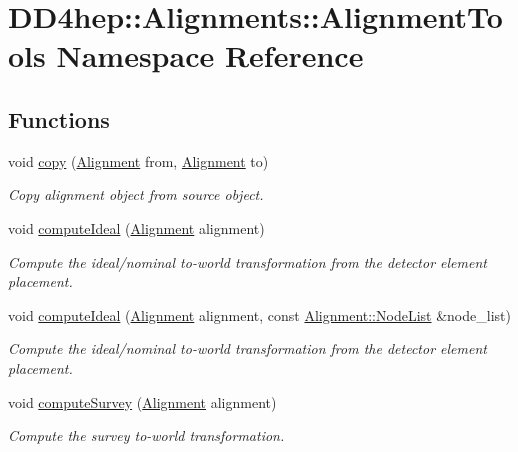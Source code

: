 \hypertarget{namespace_d_d4hep_1_1_alignments_1_1_alignment_tools}{
\section{DD4hep::Alignments::AlignmentTools Namespace Reference}
\label{namespace_d_d4hep_1_1_alignments_1_1_alignment_tools}
}
\subsection*{Functions}
\begin{DoxyCompactItemize}
\item 
void \hyperlink{namespace_d_d4hep_1_1_alignments_1_1_alignment_tools_a03e005e692b6427d78828d1785791a50}{copy} (\hyperlink{class_d_d4hep_1_1_alignments_1_1_alignment}{Alignment} from, \hyperlink{class_d_d4hep_1_1_alignments_1_1_alignment}{Alignment} to)
\begin{DoxyCompactList}\small\item\em Copy alignment object from source object. \item\end{DoxyCompactList}\item 
void \hyperlink{namespace_d_d4hep_1_1_alignments_1_1_alignment_tools_a009dd48155bddca23afba151e2887124}{computeIdeal} (\hyperlink{class_d_d4hep_1_1_alignments_1_1_alignment}{Alignment} alignment)
\begin{DoxyCompactList}\small\item\em Compute the ideal/nominal to-\/world transformation from the detector element placement. \item\end{DoxyCompactList}\item 
void \hyperlink{namespace_d_d4hep_1_1_alignments_1_1_alignment_tools_a531f04a21638b77afa2f81378f5837cd}{computeIdeal} (\hyperlink{class_d_d4hep_1_1_alignments_1_1_alignment}{Alignment} alignment, const \hyperlink{class_d_d4hep_1_1_alignments_1_1_alignment_a83282984664b4e1117f46d8a8bc40cb7}{Alignment::NodeList} \&node\_\-list)
\begin{DoxyCompactList}\small\item\em Compute the ideal/nominal to-\/world transformation from the detector element placement. \item\end{DoxyCompactList}\item 
void \hyperlink{namespace_d_d4hep_1_1_alignments_1_1_alignment_tools_af9a9447a5a7239e67ab41f0157931822}{computeSurvey} (\hyperlink{class_d_d4hep_1_1_alignments_1_1_alignment}{Alignment} alignment)
\begin{DoxyCompactList}\small\item\em Compute the survey to-\/world transformation. \item\end{DoxyCompactList}\end{DoxyCompactItemize}


